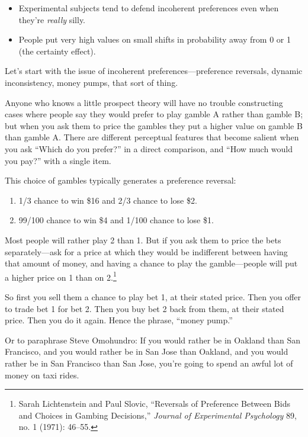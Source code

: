 \begin{itemize}
\item {
 Experimental subjects tend to defend incoherent preferences even
when they're \textit{really} silly.}

\item {
 People put very high values on small shifts in probability away
 from 0 or 1 (the certainty effect).}
\end{itemize}


 Let's start with the issue of incoherent
preferences---preference reversals, dynamic inconsistency, money pumps,
that sort of thing.


 Anyone who knows a little prospect theory will have no trouble
constructing cases where people say they would prefer to play gamble A
rather than gamble B; but when you ask them to price the gambles they
put a higher value on gamble B than gamble A. There are different
perceptual features that become salient when you ask
``Which do you prefer?'' in a direct
comparison, and ``How much would you
pay?'' with a single item.


 This choice of gambles typically generates a preference reversal:

\begin{enumerate}
\item {
 1/3 chance to win \$16 and 2/3 chance to lose \$2.}

\item {
  99/100 chance to win \$4 and 1/100 chance to lose \$1.}
\end{enumerate}

{
 Most people will rather play 2 than 1. But if you ask them to
price the bets separately---ask for a price at which they would be
indifferent between having that amount of money, and having a chance to
play the gamble---people will put a higher price on 1 than on
2.\footnote{Sarah Lichtenstein and Paul Slovic,
``Reversals of Preference Between Bids and Choices in
Gambing Decisions,'' \textit{Journal of Experimental
Psychology} 89, no. 1 (1971): 46--55.}}


 So first you sell them a chance to play bet 1, at their stated
price. Then you offer to trade bet 1 for bet 2. Then you buy bet 2 back
from them, at their stated price. Then you do it again. Hence the
phrase, ``money pump.''


 Or to paraphrase Steve Omohundro: If you would rather be in
Oakland than San Francisco, and you would rather be in San Jose than
Oakland, and you would rather be in San Francisco than San Jose,
you're going to spend an awful lot of money on taxi
rides.


